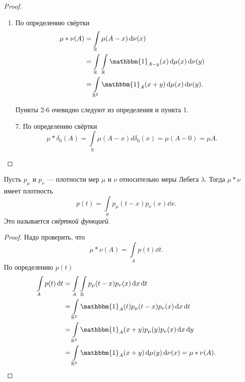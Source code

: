       \begin{proof}
\enewline
         \begin{enumerate}
             \item По определению свёртки
             \begin{align*}
                 \mu * \nu(A) &= \int\limits_\mathbb{R} \mu(A - x) \dd\nu(x) \\&= \int\limits_{\mathbb{R}}\int\limits_\mathbb{R} \mathbbm{1}_{A - y}(x) \dd\mu(x)\dd\nu(y) \\&= \int\limits_{\mathbb{R}^2}\mathbbm{1}_A (x + y) \dd\mu(x)\dd\nu(y).
             \end{align*}
             \item[] Пункты 2-6 очевидно следуют из определения и пункта 1.
             \item[7.] По определению свёртки
             $$\mu*\delta_0 (A) = \int\limits_\mathbb{R} \mu(A - x)d\delta_0(x) =  \mu (A - 0) = \mu A.$$ \qedhere
         \end{enumerate}
                       
\end{proof}

     \begin{theorem}
         Пусть $p_\mu$ и $p_\nu$ --- плотности мер $\mu$ и $\nu$ относительно меры Лебега $\lambda$.
         Тогда $\mu*\nu$ имеет плотность
         $$p(t) = \int\limits_\mathbb{R} p_\mu (t - x) p_\nu (x) \dd x.$$
         Это называется \textit{свёрткой функцией}.
     \end{theorem}

     \begin{proof}
        Надо проверить, что 
        $$\mu*\nu(A) = \int\limits_A p(t)\dd t.$$ 
        По определению $p(t)$
        \begin{align*}
            \int\limits_A p(t)\dd t &= \int\limits_A\int\limits_\mathbb{R} p_\mu(t - x)p_\nu(x)\dd x\dd t \\&= \int\limits_{\mathbb{R}^2}\mathbbm{1}_A(t)p_\mu(t-x)p_\nu(x) \dd x\dd t \\&= \int\limits_{\mathbb{R}^2}\mathbbm{1}_A(x+y)p_\mu(y)p_\nu(x)\dd x\dd y \\&= \int\limits_{\mathbb{R}^2} \mathbbm{1}_A(x+y) \dd\mu(y)\dd\nu(x) = \mu*\nu(A).
        \end{align*}
       
     \end{proof}
\newpage
